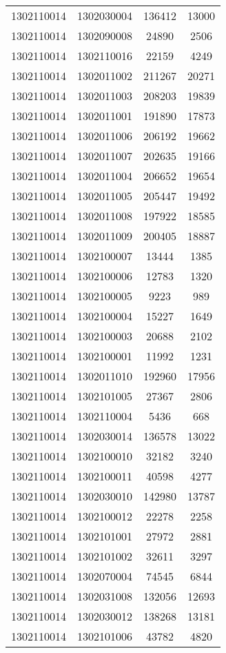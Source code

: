 \begin{longtable}{llcc}
1302110014 & 1302030004 & 136412 & 13000\\
1302110014 & 1302090008 & 24890 & 2506\\
1302110014 & 1302110016 & 22159 & 4249\\
1302110014 & 1302011002 & 211267 & 20271\\
1302110014 & 1302011003 & 208203 & 19839\\
1302110014 & 1302011001 & 191890 & 17873\\
1302110014 & 1302011006 & 206192 & 19662\\
1302110014 & 1302011007 & 202635 & 19166\\
1302110014 & 1302011004 & 206652 & 19654\\
1302110014 & 1302011005 & 205447 & 19492\\
1302110014 & 1302011008 & 197922 & 18585\\
1302110014 & 1302011009 & 200405 & 18887\\
1302110014 & 1302100007 & 13444 & 1385\\
1302110014 & 1302100006 & 12783 & 1320\\
1302110014 & 1302100005 & 9223 & 989\\
1302110014 & 1302100004 & 15227 & 1649\\
1302110014 & 1302100003 & 20688 & 2102\\
1302110014 & 1302100001 & 11992 & 1231\\
1302110014 & 1302011010 & 192960 & 17956\\
1302110014 & 1302101005 & 27367 & 2806\\
1302110014 & 1302110004 & 5436 & 668\\
1302110014 & 1302030014 & 136578 & 13022\\
1302110014 & 1302100010 & 32182 & 3240\\
1302110014 & 1302100011 & 40598 & 4277\\
1302110014 & 1302030010 & 142980 & 13787\\
1302110014 & 1302100012 & 22278 & 2258\\
1302110014 & 1302101001 & 27972 & 2881\\
1302110014 & 1302101002 & 32611 & 3297\\
1302110014 & 1302070004 & 74545 & 6844\\
1302110014 & 1302031008 & 132056 & 12693\\
1302110014 & 1302030012 & 138268 & 13181\\
1302110014 & 1302101006 & 43782 & 4820\\

\end{longtable}
